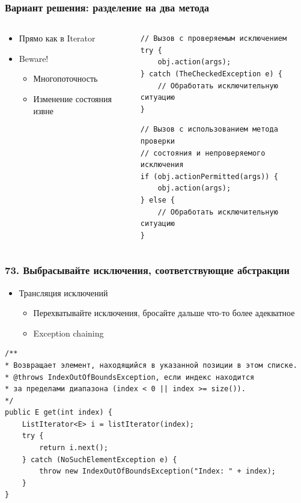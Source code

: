 \documentclass[xetex,mathserif,serif]{beamer}
\begin{document}
	\begin{frame}[fragile]
		\frametitle{Вариант решения: разделение на два метода}
		\begin{columns}
			\begin{column}{0.4\textwidth}
				\begin{itemize}
					\item Прямо как в Iterator
					\item Beware!
					\begin{itemize}
						\item Многопоточность
						\item Изменение состояния извне
					\end{itemize}
				\end{itemize}
			\end{column}
			\begin{column}{0.6\textwidth}
				\begin{footnotesize}
					\begin{verbatim}
// Вызов с проверяемым исключением
try {
    obj.action(args);
} catch (TheCheckedException e) {
    // Обработать исключительную ситуацию
}
					\end{verbatim}
					\vspace{3mm}
					\begin{verbatim}
// Вызов с использованием метода проверки
// состояния и непроверяемого исключения
if (obj.actionPermitted(args)) {
    obj.action(args);
} else {
    // Обработать исключительную ситуацию
}
					\end{verbatim}
				\end{footnotesize}
			\end{column}
		\end{columns}
	\end{frame}

	\begin{frame}[fragile]
		\frametitle{73. Выбрасывайте исключения, соответствующие абстракции}
		\begin{itemize}
			\item Трансляция исключений
			\begin{itemize}
				\item Перехватывайте исключения, бросайте дальше что-то более адекватное
				\item Exception chaining
			\end{itemize}
		\end{itemize}
		\begin{footnotesize}
			\begin{verbatim}
/**
* Возвращает элемент, находящийся в указанной позиции в этом списке.
* @throws IndexOutOfBoundsException, если индекс находится
* за пределами диапазона (index < 0 || index >= size()).
*/
public E get(int index) {
    ListIterator<E> i = listIterator(index);
    try {
        return i.next();
    } catch (NoSuchElementException e) {
        throw new IndexOutOfBoundsException("Index: " + index);
    }
}
			\end{verbatim}
		\end{footnotesize}
	\end{frame}
\end{document}
